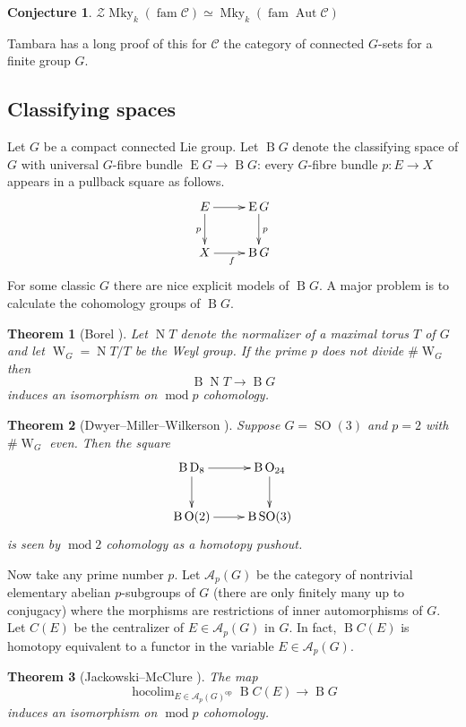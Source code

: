 \documentclass[a4paper,12pt]{article}
\newtheorem*{Theorem}{Theorem}%
\newtheorem*{Conjecture}{Conjecture}%
\theoremstyle{definition}
\theoremstyle{fact}
\theoremstyle{genquest}
\theoremstyle{step}
\newcommand{\catA}{\mathcal{A}}
\newcommand{\Aut}{\operatorname{Aut}}
\newcommand{\classB}{\operatorname{B}}
\newcommand{\BC}{\classB C}
\newcommand{\catC}{\mathcal{C}}
\newcommand{\LieD}{\operatorname{D}\nolimits}
\newcommand{\univE}{\operatorname{E}}
\newcommand{\Mky}{\operatorname{Mky}}
\newcommand{\normN}{\operatorname{N}}
\newcommand{\OO}{\operatorname{O}\nolimits}
\newcommand{\SO}{\operatorname{SO}}
\newcommand{\Weyl}{\operatorname{W}}
\newcommand{\catZ}{\mathcal{Z}}%
\newcommand{\ffam}{\operatorname{fam}}
\newcommand{\hocolim}{\operatorname{hocolim}}
\newcommand{\mmod}{\operatorname{mod}}
\newcommand{\op}{\operatorname{op}}
\newcommand{\longto}{\longrightarrow}
\begin{document}
\begin{Conjecture}
$\catZ \Mky _k (\ffam  \catC) \simeq \Mky _k (\ffam\Aut \catC)$   
\end{Conjecture}

\noindent
Tambara has a long proof of this for $\catC$ the category of connected $G$-sets for a finite group $G$.

 \subsection{Classifying spaces\label{Lecture3sub4}}

Let $G$ be a compact connected Lie group.   Let $\classB G$ denote the classifying space of $G$ with universal $G$-fibre bundle $\univE G \to \classB G$: every $G$-fibre bundle $p : E \to X$  appears in a pullback square as follows.
%
\[
\xymatrix{
    E \ar[r]  \ar[d]_p  & \univE G  \ar[d]^p \\
   X \ar[r]_f    & \classB G 
  }
\]
For some classic $G$ there are nice explicit models of $\classB G$. 
A major problem is to calculate the cohomology groups of $\classB G$.

  
 \begin{Theorem}[Borel \cite{Borel1967}]
Let $\normN T$  denote the normalizer of a maximal torus $T$ of $G$ 
and let $\Weyl_G = \normN T/T$ be the Weyl group.   
If the prime $p$ does not divide $\# \Weyl_G$  then
 \[
 \classB \normN T \longto \classB G
 \]
induces an isomorphism on $\mmod p$ cohomology.
\end{Theorem}

\begin{Theorem}[Dwyer--Miller--Wilkerson \cite{DMW1987}]
Suppose $ G = \SO(3)$ and $p = 2$ with $\#\Weyl_G $ even. 
Then the square
\[
\xymatrix{
    \classB \LieD_8 \ar[r]  \ar[d]   & \classB  \OO_{24}  \ar[d] \\
   \classB \OO(2) \ar[r]     & \classB \SO(3) 
  }
\]
is seen by $\mmod 2$ cohomology as a homotopy pushout.
\end{Theorem}
 
Now take any prime number $p$. Let $\catA_p (G)$ be the category of nontrivial elementary abelian $p$-subgroups of $G$ 
(there are only finitely many up to conjugacy) where the morphisms are restrictions of inner automorphisms of $G$.   
Let $C(E)$ be the centralizer of $E \in \catA_p (G)$ in $G$. In fact,  $\BC(E)$ is homotopy equivalent to a functor in the variable $E \in \catA_p (G)$.
 
\begin{Theorem}[Jackowski--McClure \cite{JackMcC1992}]
The map
 \[
 \hocolim_{E \in \catA_p(G)^{\op}} \BC(E) \longto \classB G
 \]
induces an isomorphism on $\mmod p$ cohomology.
 \end{Theorem}
\end{document}
